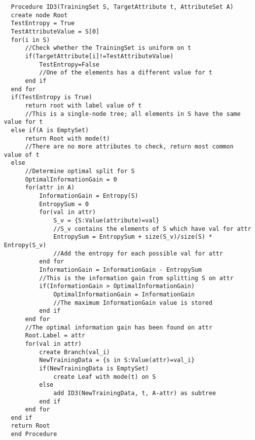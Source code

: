 \begin{lstlisting}
  Procedure ID3(TrainingSet S, TargetAttribute t, AttributeSet A)
  create node Root
  TestEntropy = True
  TestAttributeValue = S[0]
  for(i in S)
      //Check whether the TrainingSet is uniform on t
      if(TargetAttribute[i]!=TestAttributeValue)
          TestEntropy=False
          //One of the elements has a different value for t
      end if
  end for
  if(TestEntropy is True)
      return root with label value of t
      //This is a single-node tree; all elements in S have the same value for t
  else if(A is EmptySet)
      return Root with mode(t)
      //There are no more attributes to check, return most common value of t
  else
      //Determine optimal split for S
      OptimalInformationGain = 0
      for(attr in A)
          InformationGain = Entropy(S)
          EntropySum = 0
          for(val in attr)
              S_v = {S:Value(attribute)=val}
              //S_v contains the elements of S which have val for attr
              EntropySum = EntropySum + size(S_v)/size(S) * Entropy(S_v)
              //Add the entropy for each possible val for attr
          end for
          InformationGain = InformationGain - EntropySum
          //This is the information gain from splitting S on attr
          if(InformationGain > OptimalInformationGain)
              OptimalInformationGain = InformationGain
              //The maximum InformationGain value is stored
          end if
      end for
      //The optimal information gain has been found on attr
      Root.Label = attr
      for(val in attr)
          create Branch(val_i)
          NewTrainingData = {s in S:Value(attr)=val_i}
          if(NewTrainingData is EmptySet)
              create Leaf with mode(t) on S
          else
              add ID3(NewTrainingData, t, A-attr) as subtree
          end if
      end for
  end if
  return Root
  end Procedure
\end{lstlisting}

